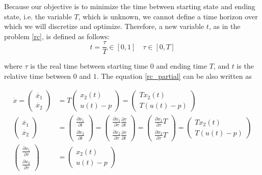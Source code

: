 \documentclass  [
  paper    = a4,
  BCOR     = 10mm,
  twoside,
  fontsize = 12pt,
  fleqn,
  toc      = bibnumbered,
  toc      = listofnumbered,
  numbers  = noendperiod,
  headings = normal,
  listof   = leveldown,
  version  = 3.03
]                                       {scrreprt}
\newcommand{\<}{\langle}
\renewcommand{\>}{\rangle}
\begin{document}
Because our objective is to minimize the time between starting state and ending state, i.e. the variable $T$, which is unknown, we cannot define a time horizon over which we will discretize and optimize. Therefore, a new variable $t$, as in the problem \ref{rc}, is defined as follows: 
\begin{equation}
	t= \frac{\tau}{T} \in [0,1] \quad \tau \in [0, T]
	\label{eqn:timet}
\end{equation}

where $\tau$ is the real time between starting time $0$ and ending time $T$, and $t$ is the relative time between $0$ and $1$.  The equation \ref{rc_partial} can be also written as 

\begin{subequations}
	\begin{align}
		\dot{x} =  \begin{pmatrix} \dot{x_1} \\ \dot{x_2} \end{pmatrix}  & =  T  \begin{pmatrix}  x_2(t) \\ u(t)-p   \end{pmatrix} = \begin{pmatrix}  Tx_2(t) \\ T(u(t)-p)   \end{pmatrix} \label{eq_difT} \\ 
		\begin{pmatrix} \dot{x_1} \\ \dot{x_2} \end{pmatrix} &= \begin{pmatrix} \frac{\partial x_1}{\partial t} \\ \frac{\partial x_2}{\partial t} \end{pmatrix} = \begin{pmatrix} \frac{\partial x_1}{\partial \tau} \frac{\partial \tau}{\partial t} \\ \frac{\partial x_2}{\partial \tau} \frac{\partial \tau}{\partial t} \end{pmatrix} =  \begin{pmatrix} \frac{\partial x_1}{\partial \tau} T \\ \frac{\partial x_2}{\partial \tau}T \end{pmatrix} =     \begin{pmatrix}  Tx_2(t) \\ T(u(t)-p)   \end{pmatrix} \\
		\begin{pmatrix} \frac{\partial x_1}{\partial \tau}  \\ \frac{\partial x_2}{\partial \tau} \end{pmatrix} & =     \begin{pmatrix}  x_2(t) \\ u(t)-p   \end{pmatrix} \label{eq_difTau}
	\end{align}
	\label{partialX}
\end{subequations}
\end{document}
